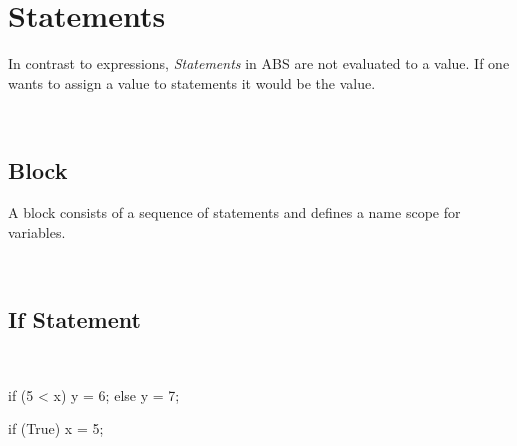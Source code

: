 \chapter{Statements}
In contrast to expressions, \emph{Statements} in ABS are not
evaluated to a value. If one wants to assign a value to statements
it would be the  value.

\begin{abssyntax}
     {}
                 {}
                 {}
                 {}
                 {}
                 {}
                 {}
                 {}
                 {}
                 {}\\
  {}
                 {}
                 {}
                 {}
\end{abssyntax}

\section{Block}
A block consists of a sequence of statements and defines a name scope for variables.



\begin{abssyntax}
  \TRS{\{}\ \ \TRS{\}}
\end{abssyntax}

\section{If Statement}

\begin{abssyntax}
  {}\ \TRS{(}  \TRS{)}\  
\end{abssyntax}

\begin{absexample}
if (5 < x) {
  y = 6;
} else {
  y = 7;
}

if (True)
  x = 5;
\end{absexample}

